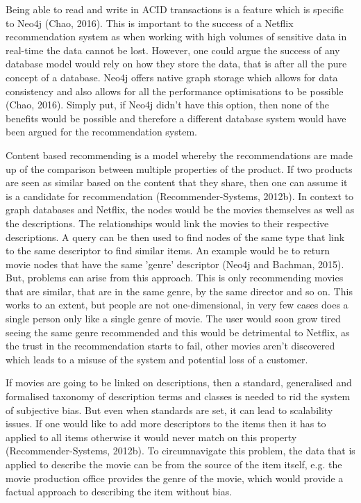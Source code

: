 \documentclass[a4paper]{article}
\begin{document}
Being able to read and write in ACID transactions is a feature which is specific to Neo4j (Chao, 2016). This is important to the success of a Netflix recommendation system as when working with high volumes of sensitive data in real-time the data cannot be lost. However, one could argue the success of any database model would rely on how they store the data, that is after all the pure concept of a database. Neo4j offers native graph storage which allows for data consistency and also allows for all the performance optimisations to be possible (Chao, 2016). Simply put, if Neo4j didn't have this option, then none of the benefits would be possible and therefore a different database system would have been argued for the recommendation system. \par

Content based recommending is a model whereby the recommendations are made up of the comparison between multiple properties of the product. If two products are seen as similar based on the content that they share, then one can assume it is a candidate for recommendation (Recommender-Systems, 2012b). In context to graph databases and Netflix, the nodes would be the movies themselves as well as the descriptions. The relationships would link the movies to their respective descriptions. A query can be then used to find nodes of the same type that link to the same descriptor to find similar items. An example would be to return movie nodes that have the same 'genre' descriptor (Neo4j and Bachman, 2015). But, problems can arise from this approach. This is only recommending movies that are similar, that are in the same genre, by the same director and so on. This works to an extent, but people are not one-dimensional, in very few cases does a single person only like a single genre of movie. The user would soon grow tired seeing the same genre recommended and this would be detrimental to Netflix, as the trust in the recommendation starts to fail, other movies aren't discovered which leads to a misuse of the system and potential loss of a customer. \par

If movies are going to be linked on descriptions, then a standard, generalised and formalised taxonomy of description terms and classes is needed to rid the system of subjective bias. But even when standards are set, it can lead to scalability issues. If one would like to add more descriptors to the items then it has to applied to all items otherwise it would never match on this property (Recommender-Systems, 2012b). To circumnavigate this problem, the data that is applied to describe the movie can be from the source of the item itself, e.g. the movie production office provides the genre of the movie, which would provide a factual approach to describing the item without bias.
\end{document}
